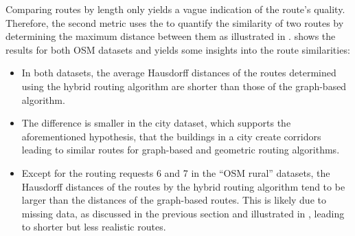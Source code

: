 			Comparing routes by length only yields a vague indication of the route's quality.
			Therefore, the second metric uses the  to quantify the similarity of two routes by determining the maximum distance between them as illustrated in .
			 shows the results for both OSM datasets and yields some insights into the route similarities:
			\begin{itemize}
				\item In both datasets, the average Hausdorff distances of the routes determined using the hybrid routing algorithm are shorter than those of the graph-based algorithm.
				\item The difference is smaller in the city dataset, which supports the aforementioned hypothesis, that the buildings in a city create corridors leading to similar routes for graph-based and geometric routing algorithms.
				\item Except for the routing requests 6 and 7 in the \enquote{OSM rural} datasets, the Hausdorff distances of the routes by the hybrid routing algorithm tend to be larger than the distances of the graph-based routes.
				This is likely due to missing data, as discussed in the previous section and illustrated in , leading to shorter but less realistic routes.
			\end{itemize}
			
